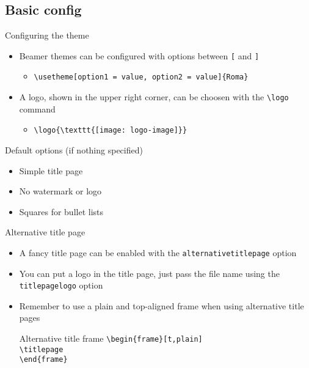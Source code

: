 \subsection{Basic config}
\begin{frame}[t,fragile]{Configuring the theme}
\begin{itemize}
\item Beamer themes can be configured with options between \verb![! and
    \verb!]!
  \begin{itemize}
  \item \verb!\usetheme[option1 = value, option2 = value]{Roma}!
  \end{itemize}
\item A logo, shown in the upper right corner, can be choosen with the
    \verb!\logo! command
  \begin{itemize}
  \item \verb!\logo{\texttt{[image: logo-image]}}!
  \end{itemize}
\end{itemize}
\begin{alertblock}{Default options (if nothing specified)}
  \begin{itemize}
  \item Simple title page
  \item No watermark or logo
  \item Squares for bullet lists
  \end{itemize}
\end{alertblock}
\end{frame}

\begin{frame}[t,fragile]{Alternative title page}
\begin{itemize}
  \item A fancy title page can be enabled with the \verb!alternativetitlepage!
      option
  \item You can put a logo in the title page, just pass the file name using the
      \verb!titlepagelogo! option
  \item Remember to use a plain and top-aligned frame when using alternative title
      pages
  \begin{exampleblock}{Alternative title frame}
      \verb!\begin{frame}[t,plain]!\\
      \verb!\titlepage!\\
      \verb!\end{frame}!
  \end{exampleblock}
\end{itemize}
\end{frame}

